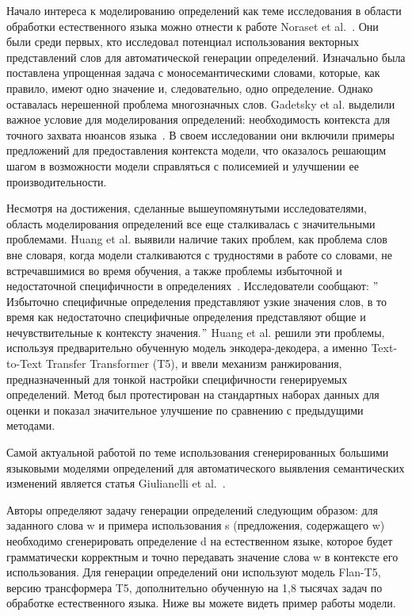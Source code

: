 \documentclass[LI,VKR]{HSEUniversity}
\begin{document}
Начало интереса к моделированию определений как теме исследования
в области обработки естественного языка можно отнести
к работе Noraset et al.~\cite{noraset2016definition}.
Они были среди первых, кто исследовал потенциал использования векторных представлений слов
для автоматической генерации определений.
Изначально была поставлена упрощенная задача с моносемантическими словами,
которые, как правило, имеют одно значение и, следовательно, одно определение.
Однако оставалась нерешенной проблема многозначных слов.
Gadetsky et al. выделили важное условие для моделирования определений:
необходимость контекста для точного захвата нюансов языка~\cite{gadetsky-etal-2018-conditional}.
В своем исследовании они включили примеры предложений для предоставления контекста модели,
что оказалось решающим шагом в возможности модели справляться с полисемией и улучшении
ее производительности.

Несмотря на достижения, сделанные вышеупомянутыми исследователями,
область моделирования определений все еще сталкивалась с значительными проблемами.
Huang et al. выявили наличие таких проблем,
как проблема слов вне словаря, когда модели сталкиваются с трудностями в работе со словами,
не встречавшимися во время обучения, а также проблемы избыточной и недостаточной
специфичности в определениях~\cite{huang-etal-2021-definition}.
Исследователи сообщают: \("\)Избыточно специфичные определения представляют узкие значения слов,
в то время как недостаточно специфичные определения представляют общие и
нечувствительные к контексту значения.\("\)
Huang et al. решили эти проблемы,
используя предварительно обученную модель энкодера-декодера,
а именно Text-to-Text Transfer Transformer (T5),
и ввели механизм ранжирования, предназначенный для тонкой настройки специфичности
генерируемых определений.
Метод был протестирован на стандартных наборах данных для оценки и показал значительное
улучшение по сравнению с предыдущими методами.

Самой актуальной работой по теме использования сгенерированных большими языковыми моделями
определений для автоматического выявления семантических изменений является статья
Giulianelli et al.~\cite{DefinitionGenerationMainArticle}.

Авторы определяют задачу генерации определений следующим образом: для заданного слова w и примера
использования s (предложения, содержащего w) необходимо сгенерировать определение d на
естественном языке, которое будет грамматически корректным и точно передавать значение слова
w в контексте его использования.
Для генерации определений они используют модель Flan-T5, версию трансформера T5,
дополнительно обученную на 1,8 тысячах задач по обработке естественного языка.
Ниже вы можете видеть пример работы модели.
\end{document}
